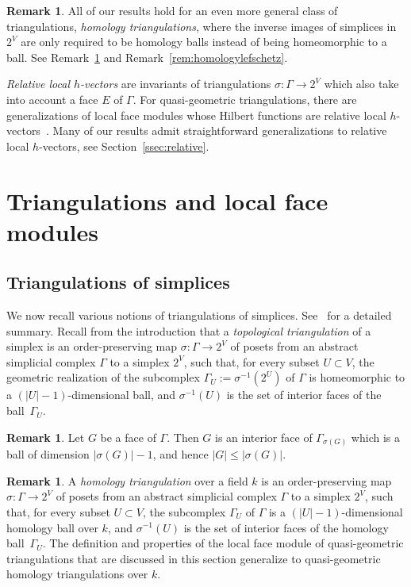 \documentclass[11pt]{article}
\theoremstyle{definition}
\newtheorem{rema}[theo]{Remark}
\numberwithin{equation}{section}
\numberwithin{equation}{section}
\begin{document}
\begin{rema}
All of our results hold for an even more general class of triangulations, \emph{homology triangulations}, where the inverse images of simplices in $2^V$ are only required to be homology balls instead of being homeomorphic to a ball. See Remark~\ref{rem:homology1} and Remark~\ref{rem:homologylefschetz}.
\end{rema}

\emph{Relative local $h$-vectors} are invariants of triangulations $\sigma \colon \Gamma \to 2^V$ which also take into account a face $E$ of $\Gamma$. For quasi-geometric triangulations, there are generalizations of local face modules whose Hilbert functions are relative local $h$-vectors~\cite{Athanasiadis12b,LPS1}.
Many of our results admit straightforward generalizations to relative local $h$-vectors, see Section~\ref{ssec:relative}.

\section{Triangulations and local face modules}

\subsection{Triangulations of simplices}\label{sec:triang}

We now recall various notions of triangulations of simplices. See~\cite[Section 2]{AthanasiadisSurvey} for a detailed summary. 
Recall from the introduction that a \emph{topological triangulation} of a simplex is an order-preserving  map $\sigma \colon \Gamma \to 2^V$ of posets from an abstract simplicial complex $\Gamma$ to a simplex $2^V$, 
such that, for every subset $U \subset V$, 
the geometric realization of the
subcomplex $\Gamma_U := \sigma^{-1}(2^U)$ of $\Gamma$ is homeomorphic to a $(|U| - 1)$-dimensional ball, and $\sigma^{-1}(U)$ is the set of interior faces of the ball~$\Gamma_U$. 

\begin{rema}\label{rem:GleqsigmaG}
	Let $G$ be a face of $\Gamma$. Then 
$G$ is an interior face of $\Gamma_{\sigma(G)}$ which is a ball of dimension $|\sigma(G)| - 1$, and hence  $|G| \le |\sigma(G)|$. 
\end{rema}

\begin{rema}\label{rem:homology1}
A \emph{homology triangulation} over a field $k$ 
is an order-preserving  map $\sigma \colon \Gamma \to 2^V$ of posets from an abstract simplicial complex $\Gamma$ to a simplex $2^V$, 
such that, for every subset $U \subset V$, 
the
subcomplex $\Gamma_U$ of $\Gamma$ is a $(|U| - 1)$-dimensional homology ball over $k$, and $\sigma^{-1}(U)$ is the set of interior faces of the homology ball~$\Gamma_U$.
The definition and properties of the local face module of quasi-geometric triangulations that are discussed in this section generalize to quasi-geometric homology triangulations over $k$. 
\end{rema}
\end{document}
